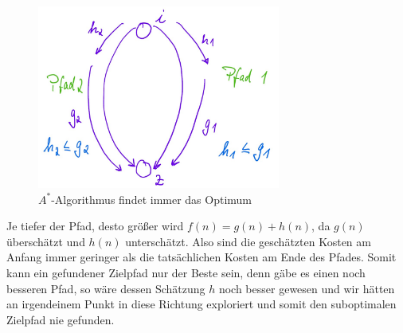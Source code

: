 \documentclass[runningheads,deutsch]{llncs}
\begin{document}
\begin{figure}
    \begin{center}
        \includegraphics[width=8cm]{a_stern_argument_grafik.jpg}
    \end{center}
    \caption{$A^*$-Algorithmus findet immer das Optimum}    
\end{figure}

Je tiefer der Pfad, desto größer wird $f(n) = g(n) + h(n)$, da $g(n)$ überschätzt und $h(n)$ unterschätzt. Also sind die geschätzten Kosten am Anfang immer geringer als die tatsächlichen Kosten am Ende des Pfades. Somit kann ein gefundener Zielpfad nur der Beste sein, denn gäbe es einen noch besseren Pfad, so wäre dessen Schätzung $h$ noch besser gewesen und wir hätten an irgendeinem Punkt in diese Richtung exploriert und somit den suboptimalen Zielpfad nie gefunden.


\pagebreak
\end{document}
